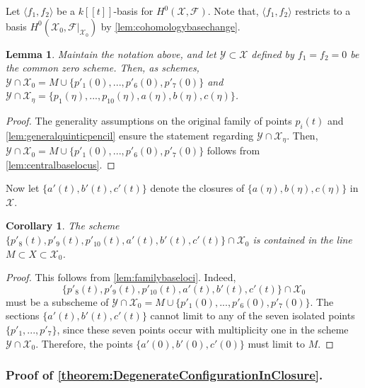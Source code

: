 \documentclass[reqno, 11pt]{amsart}
\theoremstyle{definition}
\theoremstyle{remark}
\numberwithin{equation}{section}
\numberwithin{thm}{section}
\numberwithin{prop}{section}
\numberwithin{lem}{section}
\numberwithin{cor}{section}
\numberwithin{conj}{section}
\numberwithin{defn}{section}
\theoremstyle{plain}
\newtheorem{lemma}[theorem]{Lemma}
\newtheorem{corollary}[theorem]{Corollary}
\theoremstyle{definition}
\newcommand\sssec{\subsubsection}
\newcommand\scf{\mathscr F}
\newcommand\scx{\mathscr X}
\newcommand\scy{\mathscr Y}
\begin{document}
Let $\langle f_{1}, f_{2} \rangle$ be a $k [[t]]$-basis for $H^{0}(\scx, \scf)$.
Note that, $\langle f_{1}, f_{2} \rangle$ restricts to a basis $H^{0}(\scx_{0}, \scf|_{\scx_{0}})$ by \autoref{lem:cohomologybasechange}.


\begin{lemma}\label{lem:familybaseloci}
Maintain the notation above, and let $\scy \subset \scx$ defined by $f_{1} = f_{2} = 0$ be the common zero scheme.  Then, as schemes, $\scy \cap \scx_{0} =  M \cup \{p'_{1}(0) , ... , p'_{6}(0) , p'_{7}(0)\}$ and $\scy \cap \scx_{\eta} = \{p_{1}(\eta), ... , p_{10}(\eta), a(\eta), b(\eta), c(\eta)\}$.
\end{lemma}

\begin{proof}
The generality assumptions on the original family of points $p_{i}(t)$ and \autoref{lem:generalquinticpencil} ensure the statement regarding $\scy \cap \scx_{\eta}$. Then, $\scy \cap \scx_{0} =  M \cup \{p'_{1}(0) , ... , p'_{6}(0) , p'_{7}(0)\}$ follows from \autoref{lem:centralbaselocus}.
\end{proof}

Now let $\{a'(t), b'(t), c'(t)\}$ denote the closures of $\{a(\eta), b(\eta), c(\eta)\}$ in $\scx$. 


\begin{corollary}\label{cor:closureofresidual}
The scheme $\{p'_{8}(t), p'_{9}(t), p'_{10}(t), a'(t), b'(t), c'(t)\} \cap \scx_{0}$ is contained in the line $M \subset X \subset \scx_{0}$. 
\end{corollary}

\begin{proof}
This follows from \autoref{lem:familybaseloci}.  Indeed, \[\{p'_{8}(t), p'_{9}(t), p'_{10}(t), a'(t), b'(t), c'(t)\} \cap \scx_{0}\] must be a subscheme of $\scy \cap \scx_{0} =  M \cup \{p'_{1}(0) , ... , p'_{6}(0) , p'_{7}(0)\}$.  The sections $\{a'(t), b'(t), c'(t)\}$ cannot limit to any of the seven isolated points $\{p'_{1}, ... , p'_{7}\}$, since these seven points occur with multiplicity one in the scheme $\scy \cap \scx_{0}$. Therefore, the points $\{a'(0), b'(0), c'(0)\}$  must limit to $M$. 
\end{proof}

\sssec{Proof of \autoref{theorem:DegenerateConfigurationInClosure}.}
\label{sssec:degeneration-proof}
\end{document}
